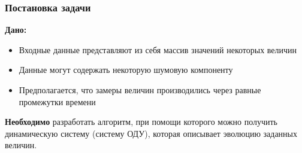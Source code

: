 \documentclass[pdf, hyperref={unicode}, aspectratio=169]{beamer}
\begin{document}
\begin{frame}
\frametitle{Постановка задачи}

\textbf{Дано:}
\begin{itemize}
  \item Входные данные представляют из себя массив значений некоторых величин
  \item Данные могут содержать некоторую шумовую компоненту
  \item Предполагается, что замеры величин производились через равные промежутки времени
\end{itemize}

\textbf{Необходимо} разработать алгоритм, при помощи которого можно получить динамическую систему (систему ОДУ), которая описывает эволюцию заданных величин.

\end{frame}
\end{document}
